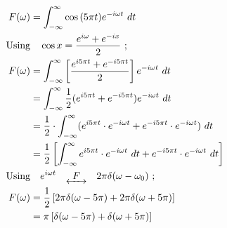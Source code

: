 \documentclass[preview]{standalone}
\begin{document}
\begin{align*}
F(\omega)&=\int_{-\infty}^{\infty} \cos{(5\pi t)} e^{-i\omega t} \ dt \\ \textrm{Using}& \quad \cos{x}=\frac{e^{i\omega}+e^{-ix}}{2} \ ; \\ F(\omega)&=\int_{-\infty}^{\infty}\left[ \frac{e^{i5\pi t}+e^{-i5\pi t}}{2}\right] e^{-i\omega t} \ dt \\ &=\int_{-\infty}^{\infty} \frac{1}{2} (e^{i5\pi t}+e^{-i5\pi t})e^{-i\omega t} \ dt \\ &=\frac{1}{2}\cdot \int_{-\infty}^{\infty}(e^{i5\pi t}\cdot e^{-i\omega t}+e^{-i5\pi t}\cdot e^{-i\omega t}) \ dt \\ &=\frac{1}{2}\left[ \int_{-\infty}^{\infty}e^{i5\pi t}\cdot e^{-i\omega t} \ dt+e^{-i5\pi t}\cdot e^{-i\omega t} \ dt \right] \\ \textrm{Using}& \quad e^{i\omega t} \quad \underleftrightarrow{ \ \ F \ \ } \quad 2\pi \delta(\omega - \omega_{0}) \ ; \\ F(\omega)&=\frac{1}{2}\left[ 2\pi \delta(\omega-5\pi)+2\pi\delta(\omega+5\pi) \right] \\ &=\pi\left[\delta(\omega-5\pi)+\delta(\omega+5\pi)\right]
\end{align*}
\end{document}
